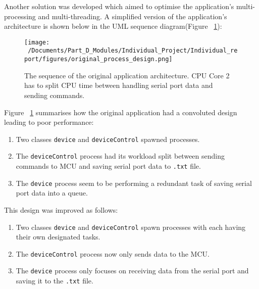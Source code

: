 Another solution was developed which aimed to optimise the application's multi-processing and multi-threading. A simplified version of the application's architecture is shown below in the UML sequence diagram(Figure ~\ref{fig:original_application_arch}):

\begin{figure}[htbp] %
	\centering
	\texttt{[image: ~/Documents/Part\_D\_Modules/Individual\_Project/Individual\_report/figures/original\_process\_design.png]} %
	\caption{The sequence of the original application architecture. CPU Core 2 has to split CPU time between handling serial port data and sending commands.}
	\label{fig:original_application_arch} %
\end{figure}

Figure ~\ref{fig:original_application_arch} summarises how the original application had a convoluted design leading to poor performance:

\begin{enumerate}
	\item Two classes \texttt{device} and \texttt{deviceControl} spawned processes. 
	\item The \texttt{deviceControl} process had its workload split between sending commands to MCU and saving serial port data to \texttt{.txt} file.  
	\item The \texttt{device} process seem to be performing a redundant task of saving serial port data into a queue. 
\end{enumerate}

This design was improved as follows:

\begin{enumerate}
	\item Two classes \texttt{device} and \texttt{deviceControl} spawn processes with each having their own designated tasks.
	\item The \texttt{deviceControl} process now only sends data to the MCU.   
	\item The \texttt{device} process only focuses on receiving data from the serial port and saving it to the \texttt{.txt} file. 
\end{enumerate}

